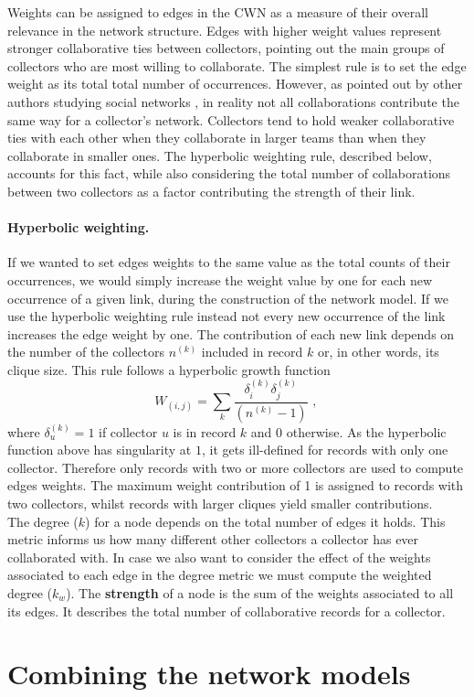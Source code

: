 Weights can be assigned to edges in the CWN as a measure of their overall relevance in the network structure. Edges with higher weight values represent stronger collaborative ties between collectors, pointing out the main groups of collectors who are most willing to collaborate. 
The simplest rule is to set the edge weight as its total total number of occurrences. However, as pointed out by other authors studying social networks \cite{Newman2001a}, in reality not all collaborations contribute the same way for a collector's network. 
Collectors tend to hold weaker collaborative ties with each other when they collaborate in larger teams than when they collaborate in smaller ones. The hyperbolic weighting rule, described below, accounts for this fact, while also considering the total number of collaborations between two collectors as a factor contributing the strength of their link.

\paragraph*{Hyperbolic weighting.}
If we wanted to set edges weights to the same value as the total counts of their occurrences, we would simply increase the weight value by one for each new occurrence of a given link, during the construction of the network model. 
If we use the hyperbolic weighting rule instead not every new occurrence of the link increases the edge weight by one. 
The contribution of each new link depends on the number of the collectors $n^{(k)}$ included in record $k$ or, in other words, its clique size. 
This rule follows a hyperbolic growth function 
\begin{equation}
W_{(i,j)} = \sum\limits_k \frac{\delta_i^{(k)} \delta_j^{(k)}}{(n^{(k)}-1)} \mbox{ , }
\end{equation}
where $\delta^{(k)}_u = 1$ if collector $u$ is in record $k$ and $0$ otherwise.
As the hyperbolic function above has singularity at $1$, it gets ill-defined for records with only one collector. 
Therefore only records with two or more collectors are used to compute edges weights. 
The maximum weight contribution of 1 is assigned to records with two collectors, whilst records with larger cliques yield smaller contributions.\\





The degree ($k$) for a node depends on the total number of edges it holds. 
This metric informs us how many different other collectors a collector has ever collaborated with.
In case we also want to consider the effect of the weights associated to each edge in the degree metric we must compute the weighted degree ($k_w$).
The \textbf{strength} of a node is the sum of the weights associated to all its edges. It describes the total number of collaborative records for a collector.





\section{Combining the network models}


